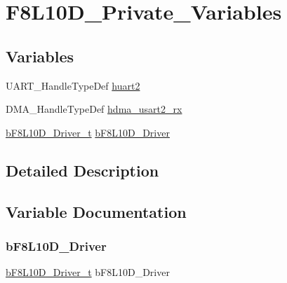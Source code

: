 \hypertarget{group___f8_l10_d___private___variables}{}\section{F8\+L10\+D\+\_\+\+Private\+\_\+\+Variables}
\label{group___f8_l10_d___private___variables}
\subsection*{Variables}
\begin{DoxyCompactItemize}
\item 
U\+A\+R\+T\+\_\+\+Handle\+Type\+Def \mbox{\hyperlink{group___f8_l10_d___private___variables_gaa9479c261d65eecedd3d9582f7f0f89c}{huart2}}
\item 
D\+M\+A\+\_\+\+Handle\+Type\+Def \mbox{\hyperlink{group___f8_l10_d___private___variables_ga784aa25dc7e4580cfbf80658340f482c}{hdma\+\_\+usart2\+\_\+rx}}
\item 
\mbox{\hyperlink{group___f8_l10_d___exported___types_definitions_ga8c86a10e36d7c236670aabfbd89c06dd}{b\+F8\+L10\+D\+\_\+\+Driver\+\_\+t}} \mbox{\hyperlink{group___f8_l10_d___private___variables_ga5afdf2a0e03c7fedf1b1c03ede3350a6}{b\+F8\+L10\+D\+\_\+\+Driver}}
\end{DoxyCompactItemize}


\subsection{Detailed Description}


\subsection{Variable Documentation}
\mbox{\label{group___f8_l10_d___private___variables_ga5afdf2a0e03c7fedf1b1c03ede3350a6}} 
\subsubsection{\texorpdfstring{b\+F8\+L10\+D\+\_\+\+Driver}{bF8L10D\_Driver}}
{\footnotesize\ttfamily \mbox{\hyperlink{group___f8_l10_d___exported___types_definitions_ga8c86a10e36d7c236670aabfbd89c06dd}{b\+F8\+L10\+D\+\_\+\+Driver\+\_\+t}} b\+F8\+L10\+D\+\_\+\+Driver}

